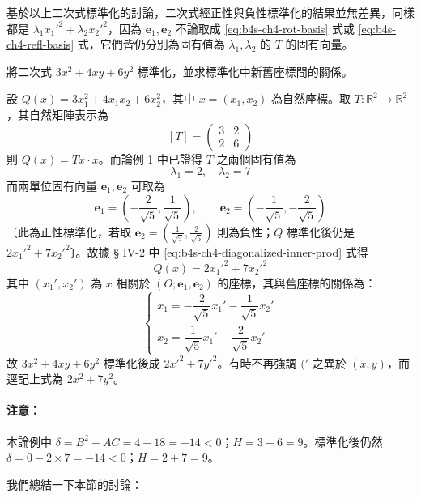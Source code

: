 基於以上二次式標準化的討論，二次式經正性與負性標準化的結果並無差異，同樣都是 $\lambda_1 {x_1'}^2 + \lambda_2 {x_2'}^2$，因為 $\mathbf{e}_1, \mathbf{e}_2$ 不論取成 \eqref{eq:b4s-ch4-rot-basis} 式或 \eqref{eq:b4s-ch4-refl-basis} 式，它們皆仍分別為固有值為 $\lambda_1, \lambda_2$ 的 $T$ 的固有向量。

\begin{discussion}
將二次式 $3x^2 + 4xy + 6y^2$ 標準化，並求標準化中新舊座標間的關係。
\end{discussion}

\begin{solution}
設 $Q(x) = 3x_1^2 + 4x_1 x_2 + 6x_2^2$，其中 $x = (x_1, x_2)$ 為自然座標。取 $T: \mathbb{R}^2 \to \mathbb{R}^2$，其自然矩陣表示為
\[
[T] = \begin{pmatrix} 3 & 2 \\ 2 & 6 \end{pmatrix}
\]
則 $Q(x) = Tx \cdot x$。而論例 1 中已證得 $T$ 之兩個固有值為
\[
\lambda_1 = 2, \quad \lambda_2 = 7
\]
而兩單位固有向量 $\mathbf{e}_1, \mathbf{e}_2$ 可取為
\[
\mathbf{e}_1 = \left( -\frac{2}{\sqrt{5}}, \frac{1}{\sqrt{5}} \right), \qquad
\mathbf{e}_2 = \left( -\frac{1}{\sqrt{5}}, -\frac{2}{\sqrt{5}} \right)
\]
〔此為正性標準化，若取 $\mathbf{e}_2 = \left( \frac{1}{\sqrt{5}}, \frac{2}{\sqrt{5}} \right)$ 則為負性；$Q$ 標準化後仍是 $2{x_1'}^2 + 7{x_2'}^2$〕。故據 § IV-2 中 \eqref{eq:b4s-ch4-diagonalized-inner-prod} 式得
\[
Q(x) = 2{x_1'}^2 + 7{x_2'}^2
\]
其中 $(x_1', x_2')$ 為 $x$ 相關於 $(O; \mathbf{e}_1, \mathbf{e}_2)$ 的座標，其與舊座標的關係為：
\[
\begin{cases}
x_1 = -\dfrac{2}{\sqrt{5}}x_1' - \dfrac{1}{\sqrt{5}}x_2' \\[0.5em]
x_2 = \dfrac{1}{\sqrt{5}}x_1' - \dfrac{2}{\sqrt{5}}x_2'
\end{cases}
\]
故 $3x^2 + 4xy + 6y^2$ 標準化後成 $2{x'}^2 + 7{y'}^2$。有時不再強調 $('$ 之異於 $(x, y)$，而逕記上式為 $2x^2 + 7y^2$。
\end{solution}

\paragraph{注意：}
本論例中 $\delta = B^2 - AC = 4 - 18 = -14 < 0$；$H = 3 + 6 = 9$。標準化後仍然 $\delta = 0 - 2 \times 7 = -14 < 0$；$H = 2 + 7 = 9$。

我們總結一下本節的討論：

